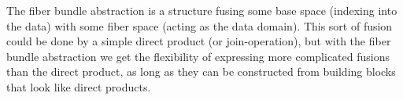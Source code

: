 \documentclass[journal]{IEEEtran}
\theoremstyle{definition}
\theoremstyle{remark}
\begin{document}
The fiber bundle abstraction is a structure fusing some \textcolor{base}{base space} (indexing into the data) with some \textcolor{fiber}{fiber space} (acting as the data domain). This sort of fusion could be done by a simple direct product (or join-operation), but with the fiber bundle abstraction we get the flexibility of expressing more complicated fusions than the direct product, as long as they can be constructed from building blocks that look like direct products.



\end{document}
